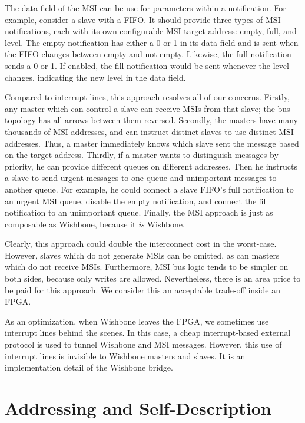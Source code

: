 \documentclass[a4paper]{jacow}
\begin{document}
The data field of the MSI can be use for parameters within a notification.
For example, consider a slave with a FIFO.
It should provide three types of MSI notifications, each with its own
configurable MSI target address: empty, full, and level.
The empty notification has either a 0 or 1 in its data field and is sent
when the FIFO changes between empty and not empty.
Likewise, the full notification sends a 0 or 1.
If enabled, the fill notification would be sent whenever the level
changes, indicating the new level in the data field.

Compared to interrupt lines, this approach resolves all of our concerns.
Firstly, any master which can control a slave can receive MSIs from that slave;
the bus topology has all arrows between them reversed.
Secondly, the masters have many thousands of MSI addresses, and can
instruct distinct slaves to use distinct MSI addresses.
Thus, a master immediately knows which slave sent the message based on the target address.
Thirdly, if a master wants to distinguish messages by priority, 
he can provide different queues on different addresses.
Then he instructs a slave to send urgent messages to one queue and
unimportant messages to another queue.
For example, he could connect a slave FIFO's full notification to an urgent MSI queue,
disable the empty notification, and connect the fill notification to an
unimportant queue.
Finally, the MSI approach is just as composable as Wishbone,
because it \emph{is} Wishbone.

Clearly, this approach could double the interconnect cost in the worst-case.
However, slaves which do not generate MSIs can be omitted,
as can masters which do not receive MSIs.
Furthermore, MSI bus logic tends to be simpler on both sides,
because only writes are allowed.
Nevertheless, there is an area price to be paid for this approach.
We consider this an acceptable trade-off inside an FPGA.

As an optimization, when Wishbone leaves the FPGA, 
we sometimes use interrupt lines behind the scenes.
In this case, a cheap interrupt-based external protocol
is used to tunnel Wishbone and MSI messages.
However, this use of interrupt lines is invisible to Wishbone masters and slaves.
It is an implementation detail of the Wishbone bridge.

\section{Addressing and Self-Description}
\end{document}
